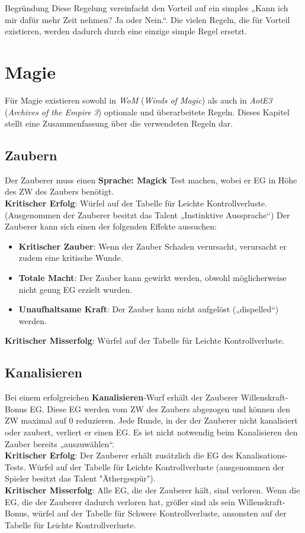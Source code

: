 \documentclass[a4paper]{article}
\begin{document}
\begin{multicols}{2}
\begin{DndComment}{Begründung}
  Diese Regelung vereinfacht den Vorteil auf ein simples „Kann ich mir dafür mehr Zeit nehmen? Ja oder Nein.“. Die vielen Regeln, die für Vorteil existieren, werden dadurch durch eine einzige simple Regel ersetzt.
\end{DndComment}

\clearpage
\section{Magie}

Für Magie existieren sowohl in \textit{WoM} (\textit{Winds of Magic}) als auch in \textit{AotE3} (\textit{Archives of the Empire 3}) optionale und überarbeitete Regeln.
Dieses Kapitel stellt eine Zusammenfassung über die verwendeten Regeln dar.

\subsection{Zaubern}
Der Zauberer muss einen \textbf{Sprache: Magick} Test machen, wobei er EG in Höhe des ZW des Zaubers benötigt.\\
\textbf{Kritischer Erfolg}: Würfel auf der Tabelle für Leichte Kontrollverluste. (Ausgenommen der Zauberer besitzt das Talent „Instinktive Aussprache“) Der Zauberer kann sich einen der folgenden Effekte aussuchen:
\begin{itemize}
  \item \textbf{Kritischer Zauber}: Wenn der Zauber Schaden verursacht, verursacht er zudem eine kritische Wunde.
  \item \textbf{Totale Macht}: Der Zauber kann gewirkt werden, obwohl möglicherweise nicht genug EG erzielt wurden.
  \item \textbf{Unaufhaltsame Kraft}: Der Zauber kann nicht aufgelöst („dispelled“) werden.
\end{itemize}
\textbf{Kritischer Misserfolg}: Würfel auf der Tabelle für Leichte Kontrollverluste.

\subsection{Kanalisieren}
Bei einem erfolgreichen \textbf{Kanalisieren}-Wurf erhält der Zauberer Willenskraft-Bonus EG. Diese EG werden vom ZW des Zaubers abgezogen und können den ZW maximal auf 0 reduzieren.
Jede Runde, in der der Zauberer nicht kanalisiert oder zaubert, verliert er einen EG.
Es ist nicht notwendig beim Kanalisieren den Zauber bereits „auszuwählen“.\\
\textbf{Kritischer Erfolg}: Der Zauberer erhält zusätzlich die EG des Kanalisations-Tests. Würfel auf der Tabelle für Leichte Kontrollverluste (ausgenommen der Spieler besitzt das Talent "Äthergespür").\\
\textbf{Kritischer Misserfolg}: Alle EG, die der Zauberer hält, sind verloren. Wenn die EG, die der Zauberer dadurch verloren hat, größer sind als sein Willenskraft-Bonus, würfel auf der Tabelle für Schwere Kontrollverluste, ansonsten auf der Tabelle für Leichte Kontrollverluste.


\end{multicols}
\end{document}
